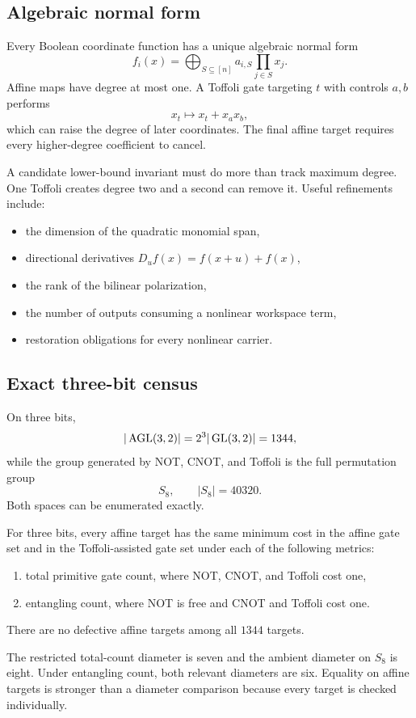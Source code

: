 \subsection{Algebraic normal form}
Every Boolean coordinate function has a unique algebraic normal form
\[
f_i(x)
=
\bigoplus_{S\subseteq[n]}a_{i,S}\prod_{j\in S}x_j.
\]
Affine maps have degree at most one.  A Toffoli gate targeting $t$ with controls $a,b$ performs
\[
x_t\longmapsto x_t+x_ax_b,
\]
which can raise the degree of later coordinates.  The final affine target requires every higher-degree coefficient to cancel.

A candidate lower-bound invariant must do more than track maximum degree.  One Toffoli creates degree two and a second can remove it.  Useful refinements include:
\begin{itemize}
\item the dimension of the quadratic monomial span,
\item directional derivatives $D_u f(x)=f(x+u)+f(x)$,
\item the rank of the bilinear polarization,
\item the number of outputs consuming a nonlinear workspace term,
\item restoration obligations for every nonlinear carrier.
\end{itemize}

\subsection{Exact three-bit census}
On three bits,
\[
|\operatorname{AGL}(3,2)|
=2^3|\operatorname{GL}(3,2)|
=1344,
\]
while the group generated by NOT, CNOT, and Toffoli is the full permutation group
\[
S_8,
\qquad |S_8|=40320.
\]
Both spaces can be enumerated exactly.

\begin{computedbox}
For three bits, every affine target has the same minimum cost in the affine gate set and in the Toffoli-assisted gate set under each of the following metrics:
\begin{enumerate}
\item total primitive gate count, where NOT, CNOT, and Toffoli cost one,
\item entangling count, where NOT is free and CNOT and Toffoli cost one.
\end{enumerate}
There are no defective affine targets among all $1344$ targets.
\end{computedbox}

The restricted total-count diameter is seven and the ambient diameter on $S_8$ is eight.  Under entangling count, both relevant diameters are six.  Equality on affine targets is stronger than a diameter comparison because every target is checked individually.

